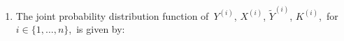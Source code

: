 \proof
\begin{enumerate}
\item
The joint probability distribution function of
\,$Y^{(i)}$, $X^{(i)}$, $\widetilde{Y}^{(i)}$, $K^{(i)}$,
\,for \,$i \in \{1,\ldots,n\}$,
\,is given by:
\begin{comment}
\begin{eqnarray*}
L &=&
	P\!\left(\;
		\overset{n}{\underset{i=1}{\bigcap}}\;
		\left\{
			Y^{(i)}=c_{i},X^{(i)}=x^{(i)},\widetilde{Y}^{(i)}=y_{i},K^{(i)}=k_{i}
		\right\}
	\;\right)
\\
&=&
	\overset{n}{\underset{i=1}{\prod}} \;
	P\!\left(\,Y^{(i)}=c_{i},X^{(i)}=x^{(i)},\widetilde{Y}^{(i)}=y_{i},K^{(i)}=k_{i}\,\right)
\\
&=&
	{\color{white}\times}\;
	\underset{i\,\in\,K_{\color{red}0}}{\prod} \;
	P\!\left(\,Y^{(i)}=c_{i},X^{(i)}=x^{(i)},\widetilde{Y}^{(i)}=y_{i},K^{(i)}={\color{red}0}\,\right)
\\
&&
	\times\;
	\underset{i\,\in\,K_{\color{red}1}}{\prod} \;
	P\!\left(\,Y^{(i)}=c_{i},X^{(i)}=x^{(i)},\widetilde{Y}^{(i)}=y_{i},K^{(i)}={\color{red}1}\,\right)
\\
&&
	\times\;
	\underset{i\,\in\,K_{\color{red}2}}{\prod} \;
	P\!\left(\,Y^{(i)}={\color{red}y_{i}},X^{(i)}=x^{(i)},\widetilde{Y}^{(i)}={\color{red}y_{i}},K^{(i)}={\color{red}2}\,\right)
\end{eqnarray*}

\begin{eqnarray*}
\log\,L
&=&
	{\color{white}+}\;
	\underset{i\,\in\,K_{\color{red}0}}{\sum} \;
	\log \;
	P\!\left(\,Y^{(i)}=c_{i},X^{(i)}=x^{(i)},\widetilde{Y}^{(i)}=y_{i},K^{(i)}={\color{red}0}\,\right)
\\
&&
	+\;
	\underset{i\,\in\,K_{\color{red}1}}{\sum} \;
	\log\;
	P\!\left(\,Y^{(i)}=c_{i},X^{(i)}=x^{(i)},\widetilde{Y}^{(i)}=y_{i},K^{(i)}={\color{red}1}\,\right)
\\
&&
	+\;
	\underset{i\,\in\,K_{\color{red}2}}{\sum} \;
	\log\;
	P\!\left(\,Y^{(i)}={\color{red}y_{i}},X^{(i)}=x^{(i)},\widetilde{Y}^{(i)}={\color{red}y_{i}},K^{(i)}={\color{red}2}\,\right)
\end{eqnarray*}

\begin{eqnarray*}
P\!\left(\,Y=c,X=x,\widetilde{Y}=y,K={\color{red}0}\,\right)
&=&
	P\!\left(\,Y=c \;\left\vert\; X=x,\widetilde{Y}=y,K=0\right.\,\right)
	\cdot
	P\!\left(\,X=x,\widetilde{Y}=y,K=0\,\right)
\\
&=&
	P\!\left(\,Y=c \;\left\vert\; X=x,\widetilde{Y}=y,J=0\right.\,\right)
	\cdot
	P\!\left(\,X=x,\widetilde{Y}=y,J=0\,\right)
\\
&=&
	P\!\left(\,Y=c \;\left\vert\; X=x,\widetilde{Y}=y\right.\,\right)
	\cdot
	P\!\left(\,X=x,\widetilde{Y}=y\,\right)
\\
&=&
	P\!\left(\,Y=c \;\left\vert\; X=x,\widetilde{Y}=y\right.\,\right)
	\cdot
	\nu_{xy}%
\end{eqnarray*}


\end{comment}
\end{enumerate}
